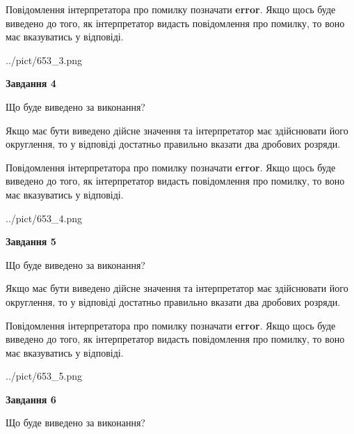 \documentclass[12pt, ukrainian]{article}
\begin{document}
{\begin {Large}
Повідомлення інтерпретатора про помилку позначати \textbf{error}.
Якщо щось буде виведено до того, як інтерпретатор видасть повідомлення про помилку, 
то воно має вказуватись у відповіді. \par

\begin{center}
	{../pict/653_3.png}
\end{center}
\newpage

{\begin {center}\textbf{Завдання 4}\end {center}}\par
Що буде виведено за виконання? \par

Якщо має бути виведено дійсне значення та інтерпретатор має здійснювати його округлення, 
то у відповіді достатньо правильно вказати два дробових розряди.

Повідомлення інтерпретатора про помилку позначати \textbf{error}.
Якщо щось буде виведено до того, як інтерпретатор видасть повідомлення про помилку, 
то воно має вказуватись у відповіді. \par

\begin{center}
	{../pict/653_4.png}
\end{center}
\newpage

{\begin {center}\textbf{Завдання 5}\end {center}}\par
Що буде виведено за виконання? \par

Якщо має бути виведено дійсне значення та інтерпретатор має здійснювати його округлення, 
то у відповіді достатньо правильно вказати два дробових розряди.

Повідомлення інтерпретатора про помилку позначати \textbf{error}.
Якщо щось буде виведено до того, як інтерпретатор видасть повідомлення про помилку, 
то воно має вказуватись у відповіді. \par

\begin{center}
	{../pict/653_5.png}
\end{center}
\newpage

{\begin {center}\textbf{Завдання 6}\end {center}}\par
Що буде виведено за виконання? \par


\end{Large}}
\end{document}
